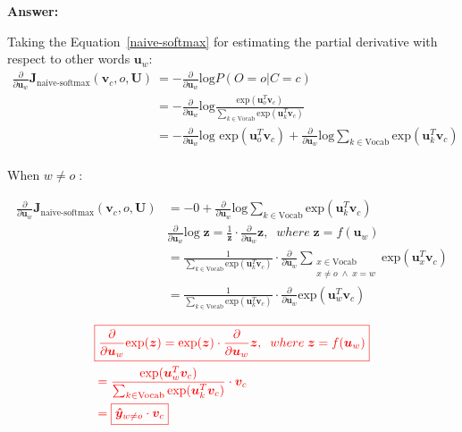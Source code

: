 \documentclass{article}
\newenvironment{answer}{
    {\bf Answer:} \sf \begingroup\color{red}
}{\endgroup}%
\begin{document}
\begin{enumerate}[label=(\alph*)]
\begin{shaded}
\begin{answer}
Taking the Equation~\ref{naive-softmax} for estimating the partial derivative with respect to other words $\bm u_w$: 
\begin{equation*}
\begin{split}
\frac{\partial}{\partial \bm u_w} \bm J_{\text{naive-softmax}}(\bm v_c, o, \bm U) & = - \frac{\partial}{\partial \bm u_w} \text{log} P(O=o|C=c)\\
 & = - \frac{\partial}{\partial \bm u_w} \text{log} \frac{\text{exp}(\bm u_o^T \bm v_c)}{\sum_{k \in \text{Vocab}}\text{exp}( \bm  u_k^T \bm v_c)}\\
 & = - \frac{\partial}{\partial \bm u_w} \text{log exp} (\bm u_o^T \bm v_c) + \frac{\partial}{\partial \bm u_w} \text{log} \sum_{k \in \text{Vocab}} \text{exp} (\bm  u_k^T \bm v_c)\\
\end{split}
\end{equation*} 

When $w \neq o \;$:

\begin{equation*} 
\begin{split}
\frac{\partial}{\partial \bm u_w} \bm J_{\text{naive-softmax}}(\bm v_c, o, \bm U) & = - 0 + \frac{\partial}{\partial \bm u_w} \text{log} \sum_{k \in \text{Vocab}} \text{exp} (\bm  u_k^T \bm v_c)\\
 & \boxed{ \frac{\partial}{\partial \bm u_w} \text{log} \;\bm z = \frac{1}{\bm z} \cdot \frac{\partial}{\partial \bm u_w} \bm z , \;\; where \; \bm z = f(\bm u_w)}\\
 & = \frac{1}{\sum_{k \in \text{Vocab}} \text{exp} (\bm  u_k^T \bm v_c)} \cdot \frac{\partial}{\partial \bm u_w} \sum_{\substack{x \in \text{Vocab} \\ x \neq o \; 	\wedge \; x = w}} \text{exp} (\bm  u_x^T \bm v_c)\\
 & = \frac{1}{\sum_{k \in \text{Vocab}} \text{exp} (\bm  u_k^T \bm v_c)} \cdot \frac{\partial}{\partial \bm u_w} \text{exp} (\bm  u_w^T \bm v_c)
\end{split}
\end{equation*}
 
 
\begin{equation*} 
\color{red}
\begin{split}
 & \boxed{ \frac{\partial}{\partial \bm u_w} \text{exp} (\bm z) = \text{exp} (\bm z) \cdot \frac{\partial}{\partial \bm u_w} \bm z , \;\; where \; \bm z = f(\bm u_w)}\\
 & = \frac{\text{exp} (\bm  u_w^T \bm v_c)}{\sum_{k \in \text{Vocab}} \text{exp} (\bm  u_k^T \bm v_c)} \cdot \bm v_c\\
 &  = \boxed{\bm \hat {\bm y}_{w \neq o} \cdot \bm v_c}\\
\end{split}
\end{equation*}


\end{answer}
\end{shaded}
\end{enumerate}
\end{document}
